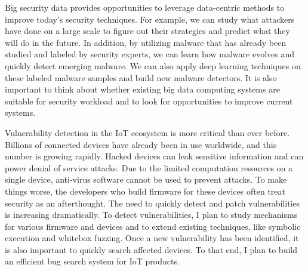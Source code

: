 \documentclass[10pt]{article}
\begin{document}
Big security data provides opportunities to leverage data-centric methods to improve today's security techniques. 
For example, we can study what attackers have done on a large scale to figure out their strategies and predict what they will do in the future. 
In addition, by utilizing malware that has already been studied and labeled by security experts, 
we can learn how malware evolves and quickly detect emerging malware. 
We can also apply deep learning techniques on these labeled malware samples and build new malware detectors. 
It is also important to think about whether existing big data computing systems are suitable for security workload
and to look for opportunities to improve current systems.

Vulnerability detection in the IoT ecosystem is more critical than ever before.
Billions of connected devices have already been in use worldwide, 
and this number is growing rapidly.  
Hacked devices can leak sensitive information and can power denial of service attacks. 
Due to the limited computation resources on a single device, 
anti-virus software cannot be used to prevent attacks. 
To make things worse, the developers who build firmware for these devices often treat security as an afterthought. 
The need to quickly detect and patch vulnerabilities is increasing dramatically. 
To detect vulnerabilities, I plan to study mechanisms for various firmware and devices 
and to extend existing techniques, like symbolic execution and whitebox fuzzing. 
Once a new vulnerability has been identified, it is also important to quickly search affected devices. 
To that end, I plan to build an efficient bug search system for IoT products.  


\newpage


\end{document}
